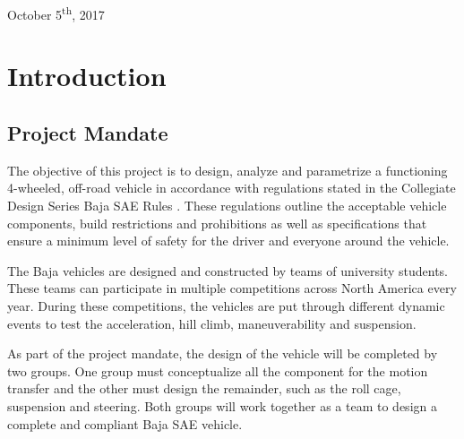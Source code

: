 \documentclass[12pt,twoside]{article}
\begin{document}
\begin{titlepage}
\begin{center}
			
			
			{\large October 5\textsuperscript{th}, 2017}\\
			
			\vfill %
			
		\end{center} %
		
	\end{titlepage} %
	
	\renewcommand{\thepage}{\roman{page}} %
	\newpage %
	\tableofcontents
	\thispagestyle{plain}
	\newpage
	\listoffigures
    \newpage
    \thispagestyle{plain}
    \printglossary[type=\acronymtype]    
    \newpage
	
	\renewcommand{\thepage}{\arabic{page}}
	\setcounter{page}{1}
		
     \section{Introduction}
    \subsection{Project Mandate}
    The objective of this project is to design, analyze and parametrize a functioning 4-wheeled, off-road vehicle in accordance with regulations stated in the Collegiate Design Series Baja \acrfull{SAE} Rules \cite{bajarules}. These regulations outline the acceptable vehicle components, build restrictions and prohibitions as well as specifications that ensure a minimum level of safety for the driver and everyone around the vehicle. 
    
    The Baja vehicles are designed and constructed by teams of university students. These teams can participate in multiple competitions across North America every year. During these competitions, the vehicles are put through different dynamic events to test the acceleration, hill climb, maneuverability and suspension. 
    
    As part of the project mandate, the design of the vehicle will be completed by two groups. One group must conceptualize all the component for the motion transfer and the other must design the remainder, such as the roll cage, suspension and steering. Both groups will work together as a team to design a complete and compliant Baja SAE vehicle.
    
\end{document}
